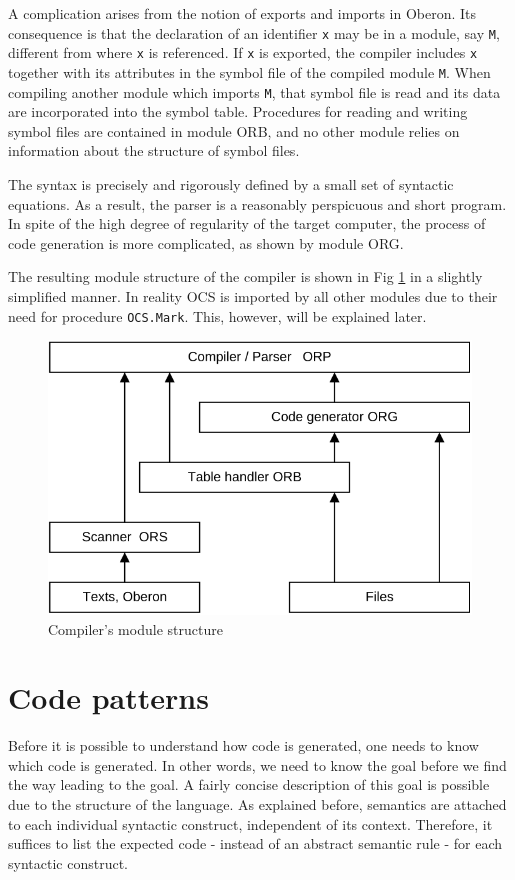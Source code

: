 A complication arises from the notion of exports and imports in Oberon. Its consequence is that the
declaration of an identifier \verb|x| may be in a module, say \verb|M|, different from where \verb|x|
is referenced. If \verb|x| is exported, the compiler includes \verb|x| together with its attributes
in the symbol file of the compiled module \verb|M|. When compiling another module which imports
\verb|M|, that symbol file is read and its data are incorporated into the symbol table. Procedures
for reading and writing symbol files are contained in module ORB, and no other module relies on
information about the structure of symbol files.

The syntax is precisely and rigorously defined by a small set of syntactic equations. As a result,
the parser is a reasonably perspicuous and short program. In spite of the high degree of regularity
of the target computer, the process of code generation is more complicated, as shown by module ORG.

The resulting module structure of the compiler is shown in Fig \ref{fig:modstruct} in a slightly
simplified manner.  In reality OCS is imported by all other modules due to their need for procedure
\verb|OCS.Mark|. This, however, will be explained later.
\begin{figure}[h!]
  \centering
  \includegraphics[width=.75\textwidth]{i/C/1.png}
  \caption{Compiler's module structure}
  \label{fig:modstruct}
\end{figure}

\section{Code patterns}
\label{sec:codeptn}
Before it is possible to understand how code is generated, one needs to know which code is
generated. In other words, we need to know the goal before we find the way leading to the goal. A
fairly concise description of this goal is possible due to the structure of the language. As explained
before, semantics are attached to each individual syntactic construct, independent of its context.
Therefore, it suffices to list the expected code - instead of an abstract semantic rule - for each
syntactic construct.

